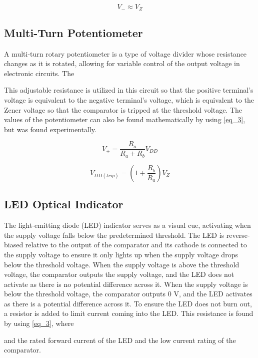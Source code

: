 \documentclass[conference]{IEEEtran}
\begin{document}
\begin{equation}
V_- \approx V_Z\label{eq_1}
\end{equation}


\subsection{Multi-Turn Potentiometer}

A multi-turn rotary potentiometer is a type of voltage divider whose resistance changes as it is rotated, allowing for variable control of the output voltage in electronic circuits. The 

This adjustable resistance is utilized in this circuit so that the positive terminal's voltage is equivalent to the negative terminal's voltage, which is equivalent to the Zener voltage so that the comparator is tripped at the threshold voltage. The values of the potentiometer can also be found mathematically by using \eqref{eq_3}, but was found experimentally.

\begin{equation}
V_+ = \frac{R_a}{R_a + R_b} V_{DD}\label{eq_2}
\end{equation}

\begin{equation}
V_{DD(trip)} = (1 + \frac{R_b}{R_a})V_{Z}\label{eq_3}
\end{equation}

\subsection{LED Optical Indicator}

The light-emitting diode (LED) indicator serves as a visual cue, activating when the supply voltage falls below the predetermined threshold. The LED is reverse-biased relative to the output of the comparator and its cathode is connected to the supply voltage to ensure it only lights up when the supply voltage drops below the threshold voltage. When the supply voltage is above the threshold voltage, the comparator outputs the supply voltage, and the LED does not activate as there is no potential difference across it. When the supply voltage is below the threshold voltage, the comparator outputs 0 V, and the LED activates as there is a potential difference across it. To ensure the LED does not burn out, a resistor is added to limit current coming into the LED. This resistance is found by using \eqref{eq_3}, where 

and the rated forward current of the LED and the low current rating of the comparator.
\end{document}
